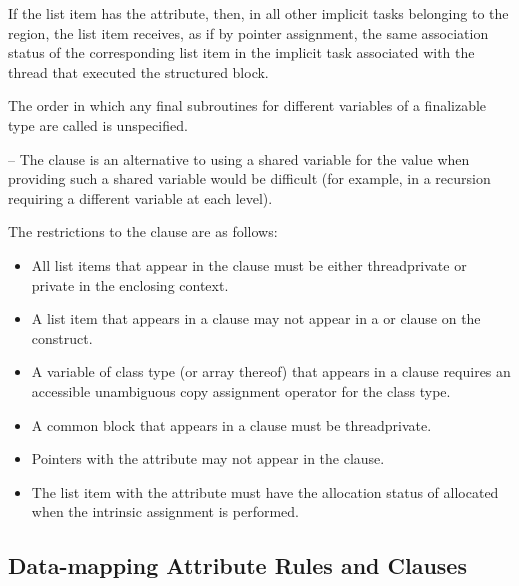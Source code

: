 {{{{If the list item has the  attribute, then, in all other implicit tasks belonging to 
the  region, the list item receives, as if by pointer assignment, the same 
association status of the corresponding list item in the implicit task associated with the 
thread that executed the structured block.

The order in which any final subroutines for different variables of a finalizable type are called is unspecified.
\fortranspecificend

\notestart
\noteheader – The  clause is an alternative to using a shared variable for the 
value when providing such a shared variable would be difficult (for example, in a 
recursion requiring a different variable at each level). 
\noteend

\restrictions
The restrictions to the  clause are as follows:

\begin{itemize}
\item All list items that appear in the  clause must be either threadprivate 
or private in the enclosing context.

\item A list item that appears in a  clause may not appear in a  or
 clause on the  construct. 

\cppspecificstart
\item A variable of class type (or array thereof) that appears in a  clause 
requires an accessible unambiguous copy assignment operator for the class type.
\cppspecificend

\fortranspecificstart
\item A common block that appears in a  clause must be threadprivate. 

\item Pointers with the  attribute may not appear in the  
clause.
\item The list item with the  attribute must have the allocation status of allocated when the intrinsic assignment is performed. 
\fortranspecificend
\end{itemize}








\subsection{Data-mapping Attribute Rules and Clauses}
\label{subsec:Data-mapping Attribute Rules and Clauses}

}}}}
